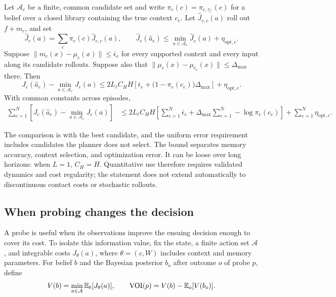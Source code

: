 \begin{corollary}\label{cor:decision}
Let $\mathcal A_e$ be a finite, common candidate set and write $\pi_e(c)=\pi_{e,\tau_e^-}(c)$ for a belief over a closed library containing the true context $c_e$. Let $\widehat J_{e,c}(a)$ roll out $f+m_c$, and set
\begin{equation}
\widehat J_e(a)=\sum_c\pi_e(c)\widehat J_{e,c}(a),
\qquad
\widehat J_e(\widehat a_e)\le\min_{a\in\mathcal A_e}\widehat J_e(a)+\eta_{\mathrm{opt},e}.
\end{equation}
Suppose $\|m_c(x)-\mu_c(x)\|\le\bar\epsilon_e$ for every supported context and every input along its candidate rollouts. Suppose also that $\|\mu_c(x)-\mu_{c_e}(x)\|\le\Delta_{\max}$ there. Then
\begin{equation}\label{eq:decisiongap}
J_e(\widehat a_e)-\min_{a\in\mathcal A_e}J_e(a)
\le 2L_\ell C_HH\left[\bar\epsilon_e+
\bigl(1-\pi_e(c_e)\bigr)\Delta_{\max}\right]+\eta_{\mathrm{opt},e}.
\end{equation}
With common constants across episodes,
\begin{align}\label{eq:cumulativedecisiongap}
\sum_{e=1}^N\left[J_e(\widehat a_e)-\min_{a\in\mathcal A_e}J_e(a)\right]
&\le 2L_\ell C_HH\left[\sum_{e=1}^N\bar\epsilon_e+
\Delta_{\max}\sum_{e=1}^N-\log\pi_e(c_e)\right]
+\sum_{e=1}^N\eta_{\mathrm{opt},e}.
\end{align}
\end{corollary}
The comparison is with the best candidate, and the uniform error requirement includes candidates the planner does not select. The bound separates memory accuracy, context selection, and optimization error. It can be loose over long horizons: when $L=1$, $C_H=H$. Quantitative use therefore requires validated dynamics and cost regularity; the statement does not extend automatically to discontinuous contact costs or stochastic rollouts.

\subsection{When probing changes the decision}
A probe is useful when its observations improve the ensuing decision enough to cover its cost. To isolate this information value, fix the state, a finite action set $\mathcal A$, and integrable costs $J_\theta(a)$, where $\theta=(c,W)$ includes context and memory parameters. For belief $b$ and the Bayesian posterior $b_o$ after outcome $o$ of probe $p$, define
\begin{equation}\label{eq:theoryvoi}
V(b)=\min_{a\in\mathcal A}\mathbb{E}_b[J_\theta(a)],
\qquad
\operatorname{VOI}(p)=V(b)-\mathbb{E}_o[V(b_o)].
\end{equation}


